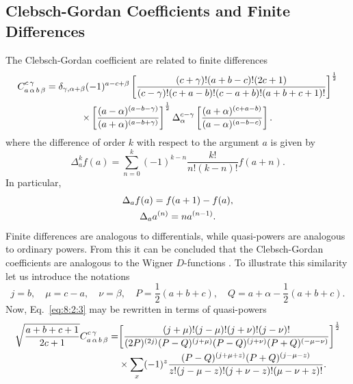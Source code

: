 \subsection{Clebsch-Gordan Coefficients and Finite Differences}\label{sec:8.2.3}
The Clebsch-Gordan coefficient are related to finite differences \cite{ref041}
\begin{gather}
C_{a\,\alpha\,b\,\beta}^{c\,\gamma}=\delta_{\gamma, \alpha+\beta}(-1)^{a-c+\beta}\left[\frac{(c+\gamma)!(a+b-c)!(2 c+1)}{(c-\gamma)!(c+a-b)!(c-a+b)!(a+b+c+1)!}\right]^{\frac{1}{2}}  \notag\\
\times\left[\frac{(a-\alpha)^{(a-b-\gamma)}}{(a+\alpha)^{(a-b+\gamma)}}\right]^{\frac{1}{2}} \Delta_{\alpha}^{c-\gamma}\left[\frac{(a+\alpha)^{(c+a-b)}}{(a-\alpha)^{(a-b-c)}}\right]. \label{eq:8:2:13}
\end{gather}
where the difference of order $k$ with respect to the argument $a$ is given by
\begin{equation}
\Delta_{a}^{k} f(a)=\sum_{n=0}^{k}(-1)^{k-n} \frac{k!}{n!(k-n)!} f(a+n). \label{eq:8:2:14}
\end{equation}
In particular,
\begin{gather}
\Delta_{a} f(a)=f(a+1)-f(a), \notag\\
\Delta_{a} a^{(n)}=n a^{(n-1)} . \label{eq:8:2:15}
\end{gather}
Finite differences are analogous to differentials, while quasi-powers are analogous to ordinary powers. From this it can be concluded that the Clebsch-Gordan coefficients are analogous to the Wigner $D$-functions \cite{ref020, ref058}. To illustrate this similarity let us introduce the notations
\begin{equation}
j=b, \quad \mu=c-a, \quad \nu=\beta, \quad P=\frac{1}{2}(a+b+c), \quad Q=a+\alpha-\frac{1}{2}(a+b+c) . \label{eq:8:2:16}
\end{equation}
Now, Eq.~\eqref{eq:8:2:3} may be rewritten in terms of quasi-powers
\begin{align}
\sqrt{\frac{a+b+c+1}{2 c+1}} C_{a\,\alpha\,b\,\beta}^{c\,\gamma}= & {\left[\frac{(j+\mu)!(j-\mu)!(j+\nu)!(j-\nu)!}{(2 P)^{(2 j)}(P-Q)^{(j+\mu)}(P-Q)^{(j+\nu)}(P+Q)^{(-\mu-\nu)}}\right]^{\frac{1}{2}} }  \notag\\
& \times \sum_{x}(-1)^{z} \frac{(P-Q)^{(j+\mu+z)}(P+Q)^{(j-\mu-z)}}{z!(j-\mu-z)!(j+\nu-z)!(\mu-\nu+z)!}. \label{eq:8:2:17}
\end{align}
